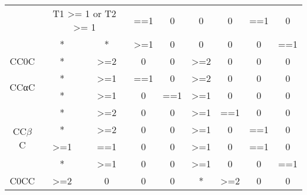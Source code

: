 \documentclass[fleqn]{article}
\begin{document}
\begin {table} [h]
\begin{tabular}{|c|c|c|c|c|c|c|c|c|}
                             & \multicolumn{2}{c|}{T1 \textgreater{}= 1 or T2 \textgreater{}= 1} & ==1              & 0   & 0                                & 0                               & ==1              & 0   \\ \cline{2-9} 
                             & *                               & *                               & \textgreater{}=1 & 0   & 0                                & 0                               & 0                & ==1 \\ \hline
CC0C                         & *                               & \textgreater{}=2                & 0                & 0   & \textgreater{}=2                 & 0                               & 0                & 0   \\ \hline
\multirow{2}{*}{CCαC}        & *                               & \textgreater{}=1                & ==1              & 0   & \textgreater{}=2                 & 0                               & 0                & 0   \\ \cline{2-9} 
                             & *                               & \textgreater{}=1                & 0                & ==1 & \textgreater{}=1                 & 0                               & 0                & 0   \\ \hline
\multirow{4}{*}{CC$\beta$C}  & *                               & \textgreater{}=2                & 0                & 0   & \textgreater{}=1                 & ==1                             & 0                & 0   \\ \cline{2-9} 
                             & *                               & \textgreater{}=2                & 0                & 0   & \textgreater{}=1                 & 0                               & ==1              & 0   \\ \cline{2-9} 
                             & \textgreater{}=1                & ==1                             & 0                & 0   & \textgreater{}=1                 & 0                               & ==1              & 0   \\ \cline{2-9} 
                             & *                               & \textgreater{}=1                & 0                & 0   & \textgreater{}=1                 & 0                               & 0                & ==1 \\ \hline
C0CC                         & \textgreater{}=2                & 0                               & 0                & 0   & *                                & \textgreater{}=2                & 0                & 0   \\ \hline

\end{tabular}
\end{table}
\end{document}
